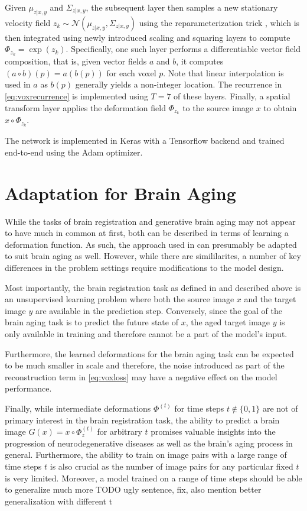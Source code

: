 Given $\mu_{z | x, y}$ and $\Sigma_{z | x, y}$, the subsequent layer then samples a new stationary velocity field $ { z_k \sim \mathcal{N}(\mu_{z | x, y}, \Sigma_{z | x, y}) } $ using the reparameterization trick \cite{kingma2013}, which is then integrated using newly introduced scaling and squaring layers to compute $\Phi_{z_k} = \exp(z_k)$. Specifically, one such layer performs a differentiable vector field composition, that is, given vector fields $a$ and $b$, it computes $(a \circ b)(p) = a(b(p))$ for each voxel $p$. Note that linear interpolation is used in $a$ as $b(p)$ generally yields a non-integer location. The recurrence in \autoref{eq:voxrecurrence} is implemented using $T = 7$ of these layers. Finally, a spatial transform layer applies the deformation field $\Phi_{z_k}$ to the source image $x$ to obtain $x \circ \Phi_{z_k}$.

The network is implemented in Keras with a Tensorflow backend and trained end-to-end using the Adam \cite{Adam} optimizer.

\section{Adaptation for Brain Aging}
While the tasks of brain registration and generative brain aging may not appear to have much in common at first, both can be described in terms of learning a deformation function. As such, the approach used in \cite{voxelmorph} can presumably be adapted to suit brain aging as well. However, while there are simililarites, a number of key differences in the problem settings require modifications to the model design.

Most importantly, the brain registration task as defined in \cite{voxelmorph} and described above is an unsupervised learning problem where both the source image $x$ and the target image $y$ are available in the prediction step. Conversely, since the goal of the brain aging task is to predict the future state of $x$, the aged target image $y$ is only available in training and therefore cannot be a part of the model's input.

Furthermore, the learned deformations for the brain aging task can be expected to be much smaller in scale and therefore, the noise introduced as part of the reconstruction term in \autoref{eq:voxloss} may have a negative effect on the model performance.

Finally, while intermediate deformations $\Phi^{(t)}$ for time steps $t \notin \{0, 1\}$ are not of primary interest in the brain registration task, the ability to predict a brain image $G(x) = x \circ \Phi_z^{(t)}$ for arbitrary $t$ promises valuable insights into the progression of neurodegenerative diseases as well as the brain's aging process in general.
Furthermore, the ability to train on image pairs with a large range of time steps $t$ is also crucial as the number of image pairs for any particular fixed $t$ is very limited. Moreover, a model trained on a range of time steps should be able to generalize much more  TODO ugly sentence, fix, also mention better generalization with different t

